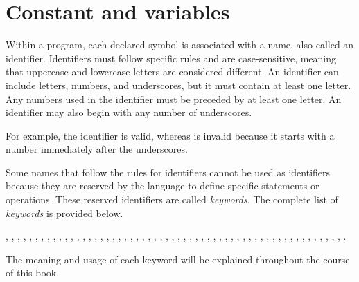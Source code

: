 \section{Constant and variables}


Within a program, each declared symbol is associated with a name, also called an
identifier. Identifiers must follow specific rules and are case-sensitive,
meaning that uppercase and lowercase letters are considered different. An
identifier can include letters, numbers, and underscores, but it must contain at
least one letter. Any numbers used in the identifier must be preceded by at
least one letter. An identifier may also begin with any number of underscores.


For example, the identifier  is valid, whereas
 is invalid because it starts with a number immediately after the
underscores.


Some names that follow the rules for identifiers cannot be used as identifiers
because they are reserved by the language to define specific statements or
operations. These reserved identifiers are called \textit{keywords}. The
complete list of \textit{keywords} is provided below.

, , , , ,
, , , , ,
, , , , , ,
, , , , ,
, , , , , ,
, , , , ,
, , , , , ,
, , , , ,
, , , , ,
, , , , ,
, , , , .


The meaning and usage of each keyword will be explained throughout
the course of this book.
